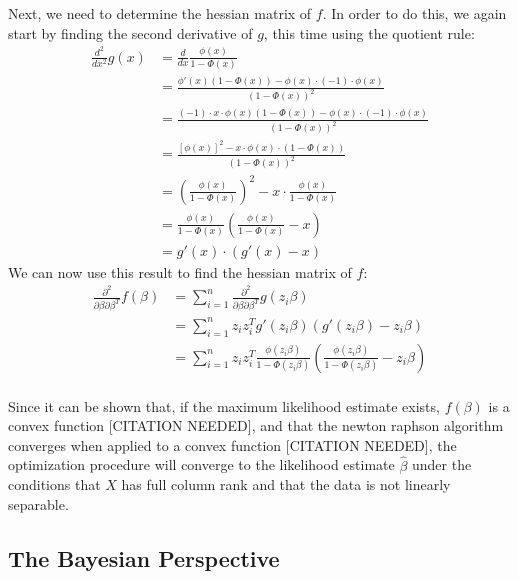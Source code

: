 Next, we need to determine the hessian matrix of $f$. In order to do this,
we again start by finding the second derivative of $g$, this time
using the quotient rule:
\begin{equation}
    \begin{split}
        \frac{d^2}{dx^2}g(x)
        & = \frac{d}{dx} \frac{\phi(x)}{1 - \Phi(x)} \\
        & = \frac{\phi'(x)(1 - \Phi(x)) - \phi(x) \cdot (-1) \cdot \phi(x)}
        {(1 - \Phi(x))^2} \\
        & = \frac{(-1) \cdot x \cdot \phi(x)(1 - \Phi(x)) - \phi(x) \cdot (-1) \cdot \phi(x)}
        {(1 - \Phi(x))^2} \\
        & = \frac{[\phi(x)]^2 - x \cdot \phi(x) \cdot (1 - \Phi(x))}{(1 - \Phi(x))^2} \\
        & = \left(\frac{\phi(x)}{1 - \Phi(x)}\right)^2 - x \cdot \frac{\phi(x)}{1 - \Phi(x)} \\
        & = \frac{\phi(x)}{1 - \Phi(x)} \left( \frac{\phi(x)}{1 - \Phi(x)} - x \right)  \\
        & = g'(x) \cdot (g'(x) - x)
    \end{split}
\end{equation}
We can now use this result to find the hessian matrix of $f$:
\begin{equation}
    \begin{split}
        \frac{\partial^2}{\partial \beta \partial \beta^T} f(\beta)
        & = \sum_{i=1}^n
        \frac{\partial^2}{\partial \beta \partial \beta^T} g(z_i \beta)\\
        & = \sum_{i=1}^n z_i z_i^T g'(z_i \beta)(g'(z_i \beta) - z_i \beta)\\
        & = \sum_{i=1}^n z_i z_i^T
        \frac{\phi(z_i \beta)}{1 - \Phi(z_i \beta)} \left( \frac{\phi(z_i \beta)}{1 - \Phi(z_i \beta)} - z_i \beta \right)  \\
    \end{split}
\end{equation}

Since it can be shown that, if the maximum likelihood estimate exists,
$f(\beta)$ is a convex function [CITATION NEEDED],
and that the newton raphson algorithm converges when applied to a convex
function [CITATION NEEDED], the optimization procedure will converge to the
likelihood estimate $\hat{\beta}$ under the conditions that
$X$ has full column rank and that the data is not linearly separable.

\subsection{The Bayesian Perspective}



\newpage